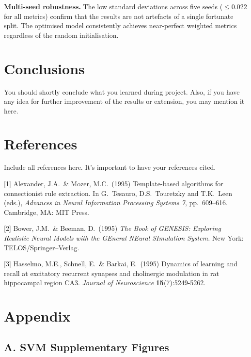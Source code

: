 \documentclass{article}
\begin{document}
\textbf{Multi-seed robustness.}
The low standard deviations across five seeds ($\leq$0.022 for all metrics) confirm that the results are not artefacts of a single fortunate split. The optimised model consistently achieves near-perfect weighted metrics regardless of the random initialisation.


	

\section{Conclusions}
You should shortly conclude what you learned during project. Also, if you have any idea for further improvement of the results or extension, you may mention it here.
	
	


\section*{References}
Include all references here. It's important to have your references cited.
\medskip
{
\small


[1] Alexander, J.A.\ \& Mozer, M.C.\ (1995) Template-based algorithms for
connectionist rule extraction. In G.\ Tesauro, D.S.\ Touretzky and T.K.\ Leen
(eds.), {\it Advances in Neural Information Processing Systems 7},
pp.\ 609--616. Cambridge, MA: MIT Press.


[2] Bower, J.M.\ \& Beeman, D.\ (1995) {\it The Book of GENESIS: Exploring
  Realistic Neural Models with the GEneral NEural SImulation System.}  New York:
TELOS/Springer--Verlag.


[3] Hasselmo, M.E., Schnell, E.\ \& Barkai, E.\ (1995) Dynamics of learning and
recall at excitatory recurrent synapses and cholinergic modulation in rat
hippocampal region CA3. {\it Journal of Neuroscience} {\bf 15}(7):5249-5262.
}

\section*{Appendix}

\subsection*{A. SVM Supplementary Figures}
\end{document}
